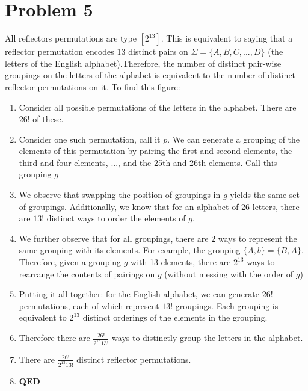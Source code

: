 \documentclass[]{article}
\begin{document}
\section{Problem 5}
All reflectors permutations are type $[2^{13}]$. This is equivalent to saying that a reflector permutation encodes 13 distinct pairs on $\Sigma = \{A, B, C, ..., D\}$ (the letters of the English alphabet).Therefore, the number of distinct pair-wise groupings on the letters of the alphabet is equivalent to the number of distinct reflector permutations on it. To find this figure:
\begin{enumerate} 
	\item Consider all possible permutations of the letters in the alphabet. There are $26!$ of these.
	\item Consider one such permutation, call it $p$. We can generate a grouping of the elements of this permutation by pairing the first and second elements, the third and four elements, ..., and the 25th and 26th elements. Call this grouping $g$
	\item We observe that swapping the position of groupings in $g$ yields the same set of groupings. Additionally, we know that for an alphabet of 26 letters, there are $13!$ distinct ways to order the elements of $g$.
	\item We further observe that for all groupings, there are $2$ ways to represent the same grouping with its elements. For example, the grouping $\{A, b\} = \{B, A\}$. Therefore, given a grouping $g$ with 13 elements, there are $2^{13}$ ways to rearrange the contents of pairings on $g$ (without messing with the order of $g$) 
	\item Putting it all together: for the English alphabet, we can generate $26!$ permutations, each of which represent $13!$ groupings. Each grouping is equivalent to $2^{13}$ distinct orderings of the elements in the grouping.
	\item Therefore there are $\frac{26!}{2^{13}13!}$ ways to distinctly group the letters in the alphabet.
	\item There are $\frac{26!}{2^{13}13!}$ distinct reflector permutations.
	\item \textbf{QED}
\end{enumerate}
\end{document}
